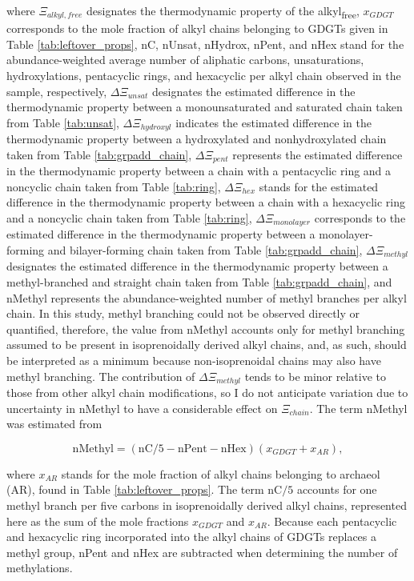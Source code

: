 \noindent where $\Xi_{alkyl, free}$ designates the thermodynamic property of the alkyl\textsubscript{free}, $x_{GDGT}$ corresponds to the mole fraction of alkyl chains belonging to GDGTs given in Table \ref{tab:leftover_props}, nC, nUnsat, nHydrox, nPent, and nHex stand for the abundance-weighted average number of aliphatic carbons, unsaturations, hydroxylations, pentacyclic rings, and hexacyclic per alkyl chain observed in the sample, respectively, $\Delta\Xi_{unsat}$ designates the estimated difference in the thermodynamic property between a monounsaturated and saturated chain taken from Table \ref{tab:unsat}, $\Delta\Xi_{hydroxyl}$ indicates the estimated difference in the thermodynamic property between a hydroxylated and nonhydroxylated chain taken from Table \ref{tab:grpadd_chain}, $\Delta\Xi_{pent}$ represents the estimated difference in the thermodynamic property between a chain with a pentacyclic ring and a noncyclic chain taken from Table \ref{tab:ring}, $\Delta\Xi_{hex}$ stands for the estimated difference in the thermodynamic property between a chain with a hexacyclic ring and a noncyclic chain taken from Table \ref{tab:ring}, $\Delta\Xi_{monolayer}$ corresponds to the estimated difference in the thermodynamic property between a monolayer-forming and bilayer-forming chain taken from Table \ref{tab:grpadd_chain}, $\Delta\Xi_{methyl}$ designates the estimated difference in the thermodynamic property between a methyl-branched and straight chain taken from Table \ref{tab:grpadd_chain}, and nMethyl represents the abundance-weighted number of methyl branches per alkyl chain. In this study, methyl branching could not be observed directly or quantified, therefore, the value from nMethyl accounts only for methyl branching assumed to be present in isoprenoidally derived alkyl chains, and, as such, should be interpreted as a minimum because non-isoprenoidal chains may also have methyl branching. The contribution of $\Delta\Xi_{methyl}$ tends to be minor relative to those from other alkyl chain modifications, so I do not anticipate variation due to uncertainty in nMethyl to have a considerable effect on $\Xi_{chain}$. The term nMethyl was estimated from

\begin{equation}
\text{nMethyl} = (\text{nC}/5 - \text{nPent} - \text{nHex})(x_{GDGT} + x_{AR}),
\end{equation}

\noindent where $x_{AR}$ stands for the mole fraction of alkyl chains belonging to archaeol (AR), found in Table \ref{tab:leftover_props}. The term nC$/5$ accounts for one methyl branch per five carbons in isoprenoidally derived alkyl chains, represented here as the sum of the mole fractions $x_{GDGT}$ and $x_{AR}$. Because each pentacyclic and hexacyclic ring incorporated into the alkyl chains of GDGTs replaces a methyl group, nPent and nHex are subtracted when determining the number of methylations.


